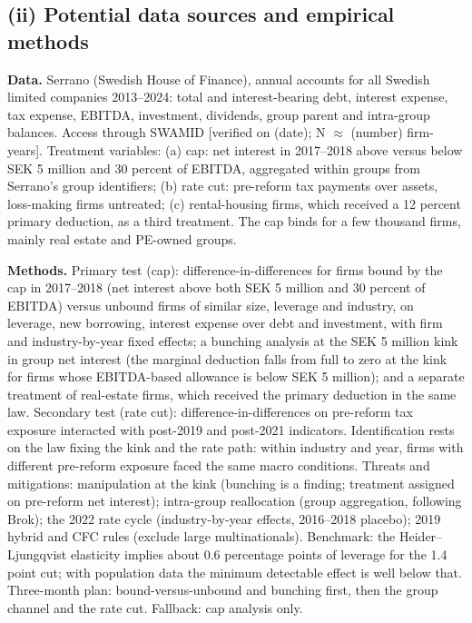 \documentclass[12pt,a4paper]{article}
\begin{document}
\subsection{(ii) Potential data sources and empirical methods}

\textbf{Data.} Serrano (Swedish House of Finance), annual accounts for all Swedish limited companies 2013--2024: total and interest-bearing debt, interest expense, tax expense, EBITDA, investment, dividends, group parent and intra-group balances. Access through SWAMID [verified on (date); N $\approx$ (number) firm-years]. Treatment variables: (a) cap: net interest in 2017--2018 above versus below SEK 5 million and 30 percent of EBITDA, aggregated within groups from Serrano's group identifiers; (b) rate cut: pre-reform tax payments over assets, loss-making firms untreated; (c) rental-housing firms, which received a 12 percent primary deduction, as a third treatment. The cap binds for a few thousand firms, mainly real estate and PE-owned groups.

\textbf{Methods.} Primary test (cap): difference-in-differences for firms bound by the cap in 2017--2018 (net interest above both SEK 5 million and 30 percent of EBITDA) versus unbound firms of similar size, leverage and industry, on leverage, new borrowing, interest expense over debt and investment, with firm and industry-by-year fixed effects; a bunching analysis at the SEK 5 million kink in group net interest (the marginal deduction falls from full to zero at the kink for firms whose EBITDA-based allowance is below SEK 5 million); and a separate treatment of real-estate firms, which received the primary deduction in the same law. Secondary test (rate cut): difference-in-differences on pre-reform tax exposure interacted with post-2019 and post-2021 indicators. Identification rests on the law fixing the kink and the rate path: within industry and year, firms with different pre-reform exposure faced the same macro conditions. Threats and mitigations: manipulation at the kink (bunching is a finding; treatment assigned on pre-reform net interest); intra-group reallocation (group aggregation, following Brok); the 2022 rate cycle (industry-by-year effects, 2016--2018 placebo); 2019 hybrid and CFC rules (exclude large multinationals). Benchmark: the Heider--Ljungqvist elasticity implies about 0.6 percentage points of leverage for the 1.4 point cut; with population data the minimum detectable effect is well below that. Three-month plan: bound-versus-unbound and bunching first, then the group channel and the rate cut. Fallback: cap analysis only.
\end{document}
